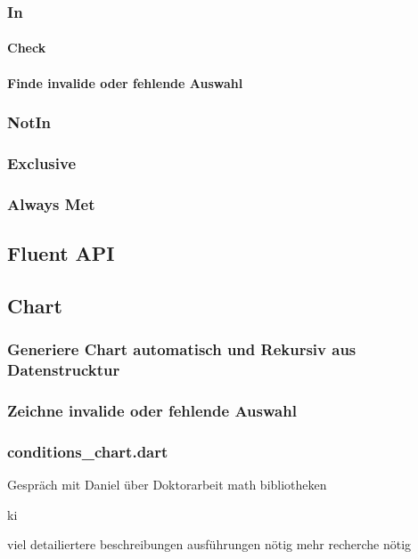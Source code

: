 \documentclass[12pt, twoside]{article}
\begin{document}
\subsubsection{In}
\paragraph{Check}
\paragraph{Finde invalide oder fehlende Auswahl}


\subsubsection{NotIn}
\subsubsection{Exclusive}
\subsubsection{Always Met}


\subsection{Fluent API} 


\subsection{Chart}
\subsubsection{Generiere Chart automatisch und Rekursiv aus Datenstrucktur}
\subsubsection{Zeichne invalide oder fehlende Auswahl}

\subsubsection{conditions_chart.dart}

Gespräch mit Daniel über Doktorarbeit
math bibliotheken

ki

viel detailiertere beschreibungen ausführungen nötig
mehr recherche nötig
\end{document}
